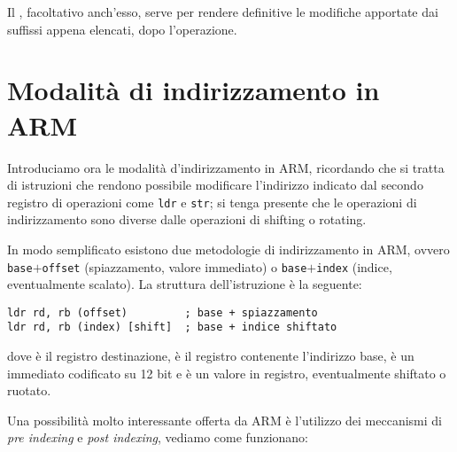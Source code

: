\documentclass[class=book, crop=false, oneside]{standalone}
\begin{document}
Il \suffix{!}, facoltativo anch'esso, serve per rendere definitive le modifiche apportate dai suffissi appena elencati, dopo l'operazione.

\section{Modalità di indirizzamento in ARM}
Introduciamo ora le modalità d'indirizzamento in ARM, ricordando che si tratta di istruzioni che rendono possibile modificare l'indirizzo indicato dal secondo registro di operazioni come \texttt{ldr} e \texttt{str}; si tenga presente che le operazioni di indirizzamento sono diverse dalle operazioni di shifting o rotating.

In modo semplificato esistono due metodologie di indirizzamento in ARM, ovvero \texttt{base}\(+\)\texttt{offset} (spiazzamento, valore immediato) o \texttt{base}\(+\)\texttt{index} (indice, eventualmente scalato). La struttura dell'istruzione è la seguente:

\begin{verbatim}
ldr rd, rb (offset)         ; base + spiazzamento
ldr rd, rb (index) [shift]  ; base + indice shiftato
\end{verbatim}
dove  è il registro destinazione,  è il registro contenente l'indirizzo base,  è un immediato codificato su 12 bit e  è un valore in registro, eventualmente shiftato o ruotato.

Una possibilità molto interessante offerta da ARM è l'utilizzo dei meccanismi di \emph{pre indexing} e \emph{post indexing}, vediamo come funzionano:
\end{document}
